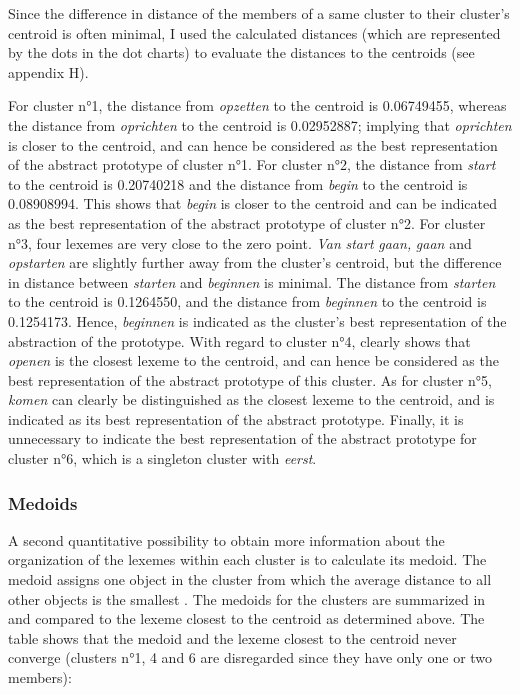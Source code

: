 Since the difference in distance of the members of a same cluster to their cluster’s centroid is often minimal, I used the calculated distances (which are represented by the dots in the dot charts) to evaluate the distances to the centroids (see appendix H).

For cluster n°1, the distance from \textit{opzetten} to the centroid is 0.06749455, whereas the distance from \textit{oprichten} to the centroid is 0.02952887; implying that \textit{oprichten} is closer to the centroid, and can hence be considered as the best representation of the abstract prototype of cluster n°1. For cluster n°2, the distance from \textit{start} to the centroid is 0.20740218 and the distance from \textit{begin} to the centroid is 0.08908994. This shows that \textit{begin} is closer to the centroid and can be indicated as the best representation of the abstract prototype of cluster n°2. For cluster n°3, four lexemes are very close to the zero point. \textit{Van} \textit{start} \textit{gaan,} \textit{gaan} and \textit{opstarten} are slightly further away from the cluster’s centroid, but the difference in distance between \textit{starten} and \textit{beginnen} is minimal. The distance from \textit{starten} to the centroid is 0.1264550, and the distance from \textit{beginnen} to the centroid is 0.1254173. Hence, \textit{beginnen} is indicated as the cluster’s best representation of the abstraction of the prototype. With regard to cluster n°4,  clearly shows that \textit{openen} is the closest lexeme to the centroid, and can hence be considered as the best representation of the abstract prototype of this cluster. As for cluster n°5, \textit{komen} can clearly be distinguished as the closest lexeme to the centroid, and is indicated as its best representation of the abstract prototype. Finally, it is unnecessary to indicate the best representation of the abstract prototype for cluster n°6, which is a singleton cluster with \textit{eerst}.

\subsubsection{Medoids}
\label{sec:4.2.3.2}  
A second quantitative possibility to obtain more information about the organization of the lexemes within each cluster is to calculate its medoid. The medoid assigns one object in the cluster from which the average distance to all other objects is the smallest \citep[164]{divjak_structuring_2010}. The medoids for the clusters are summarized in  and compared to the lexeme closest to the centroid as determined above. The table shows that the medoid and the lexeme closest to the centroid never converge (clusters n°1, 4 and 6 are disregarded since they have only one or two members):

